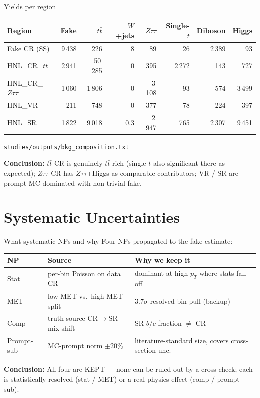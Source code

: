 \documentclass[10pt,aspectratio=169]{beamer}
\newcommand{\concl}[1]{%
  \begin{tcolorbox}[colback=conclbg,colframe=conclbord,arc=1.5mm,boxrule=0.6pt,
                    left=1mm,right=1mm,top=0.5mm,bottom=0.5mm]
  \footnotesize\textbf{Conclusion:} #1
  \end{tcolorbox}}
\newcommand{\fname}[1]{\texttt{\tiny #1}}
\begin{document}
\begin{frame}{Yields per region}
  \scriptsize
  \begin{tabular}{lrrrrrrr}
    \toprule
    Region & Fake & $t\bar t$ & $W$+jets & $Z\tau\tau$ & Single-$t$ & Diboson & Higgs \\
    \midrule
    Fake CR (SS)         & 9\,438 &    226 &    8 &     89 &      26 &  2\,389 &     93 \\
    HNL\_CR\_$t\bar t$   & 2\,941 & 50\,285 &    0 &    395 &  2\,272 &     143 &    727 \\
    HNL\_CR\_$Z\tau\tau$ & 1\,060 &  1\,806 &    0 &  3\,108 &      93 &     574 &  3\,499 \\
    HNL\_VR              &    211 &     748 &    0 &    377 &      78 &     224 &    397 \\
    HNL\_SR              & 1\,822 &  9\,018 &  0.3 &  2\,947 &     765 &  2\,307 &  9\,451 \\
    \bottomrule
  \end{tabular}
  \fname{studies/outputs/bkg\_composition.txt}
  \concl{$t\bar t$ CR is genuinely $t\bar t$-rich (single-$t$ also significant
  there as expected); $Z\tau\tau$ CR has $Z\tau\tau$+Higgs as comparable
  contributors; VR / SR are prompt-MC-dominated with non-trivial fake.}
\end{frame}

\section{Systematic Uncertainties}

\begin{frame}{What systematic NPs and why}
  \footnotesize
  Four NPs propagated to the fake estimate:
  \begin{tabular}{lll}
    \toprule
    NP & Source & Why we keep it \\
    \midrule
    Stat & per-bin Poisson on data CR & dominant at high $p_T$ where stats fall off \\
    MET  & low-MET vs.\ high-MET split & 3.7$\sigma$ resolved bin pull (backup) \\
    Comp & truth-source CR$\to$SR mix shift & SR $b/c$ fraction $\neq$ CR \\
    Prompt-sub & MC-prompt norm $\pm 20\%$ & literature-standard size, covers cross-section unc. \\
    \bottomrule
  \end{tabular}
  \concl{All four are KEPT — none can be ruled out by a cross-check; each
  is statistically resolved (stat / MET) or a real physics effect
  (comp / prompt-sub).}
\end{frame}
\end{document}

